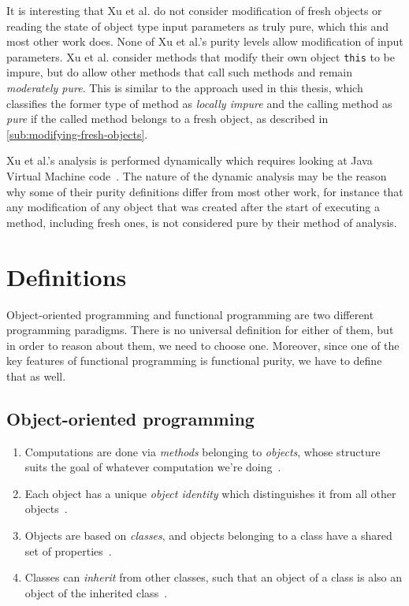 \documentclass[a4paper,12pt]{article}
\begin{document}
It is interesting that Xu et al. do not consider modification of fresh objects or reading the state of object type input parameters as truly pure, which this and most other work does. None of Xu et al.'s purity levels allow modification of input parameters. Xu et al. consider methods that modify their own object \texttt{this} to be impure, but do allow other methods that call such methods and remain \textit{moderately pure}. This is similar to the approach used in this thesis, which classifies the former type of method as \textit{locally impure} and the calling method as \textit{pure} if the called method belongs to a fresh object, as described in \autoref{sub:modifying-fresh-objects}.

Xu et al.'s analysis is performed dynamically which requires looking at Java Virtual Machine code~\cite{xu2007dynamic}. The nature of the dynamic analysis may be the reason why some of their purity definitions differ from most other work, for instance that any modification of any object that was created after the start of executing a method, including fresh ones, is not considered pure by their method of analysis.

\section{Definitions} \label{sec:definitions}

Object-oriented programming and functional programming are two different programming paradigms. There is no universal definition for either of them, but in order to reason about them, we need to choose one. Moreover, since one of the key features of functional programming is functional purity, we have to define that as well.

\subsection{Object-oriented programming} \label{ssub:object-oriented-programming}

\begin{enumerate}
\item Computations are done via \textit{methods} belonging to \textit{objects}, whose structure suits the goal of whatever computation we're doing~\cite{john-m-chambers}.
\item Each object has a unique \textit{object identity} which distinguishes it from all other objects~\cite{khoshafian1986object}.
\item Objects are based on \emph{classes}, and objects belonging to a class have a shared set of properties~\cite{john-m-chambers}.
\item Classes can \emph{inherit} from other classes, such that an object of a class is also an object of the inherited class~\cite{john-m-chambers}.
\end{enumerate}
\end{document}
